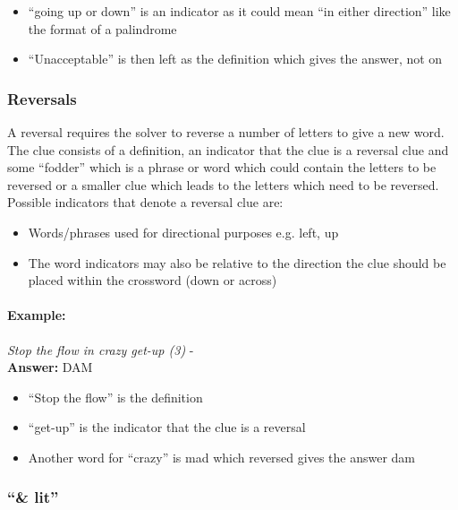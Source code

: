 \begin{itemize}
  \item ``going up or down'' is an indicator as it could mean ``in either 
        direction'' like the format of a palindrome 
  \item ``Unacceptable'' is then left as the definition which gives the answer,
        not on 
\end{itemize}


\subsubsection{Reversals}

A reversal requires the solver to reverse a number of letters to give a new
word. The clue consists of a definition, an indicator that the clue is a
reversal clue and some ``fodder'' which is a phrase or word which could contain
the letters to be reversed or a smaller clue which leads to the letters which
need to be reversed. Possible indicators that denote a reversal clue are:

\begin{itemize}
  \item Words/phrases used for directional purposes e.g. left, up 
  \item The word indicators may also be relative to the direction the clue 
        should be placed within the crossword (down or across) 
\end{itemize}

\paragraph{Example:} \emph{Stop the flow in crazy get-up (3)} - \citep{shuchiReversals08} \\
\textbf{Answer:} DAM 

\begin{itemize}
  \item ``Stop the flow'' is the definition 
  \item ``get-up'' is the indicator that the clue is a reversal 
  \item Another word for ``crazy'' is mad which reversed gives the answer dam 
\end{itemize}


\subsubsection{``\& lit''}


